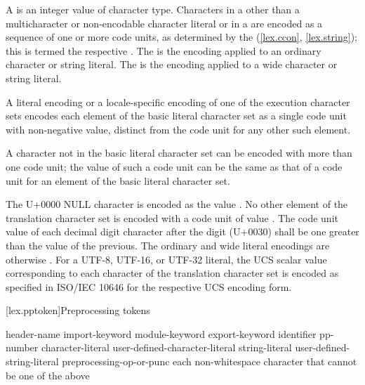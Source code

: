 \pnum
A  is an integer value
of character type.
Characters in a 
other than a multicharacter or non-encodable character literal or
in a  are encoded as
a sequence of one or more code units, as determined
by the  (\ref{lex.ccon}, \ref{lex.string});
this is termed the respective .
The  is
the encoding applied to an ordinary character or string literal.
The  is the encoding applied
to a wide character or string literal.

\pnum
A literal encoding or a locale-specific encoding of one of
the execution character sets
encodes each element of the basic literal character set as
a single code unit with non-negative value,
distinct from the code unit for any other such element.
\begin{note}
A character not in the basic literal character set
can be encoded with more than one code unit;
the value of such a code unit can be the same as
that of a code unit for an element of the basic literal character set.
\end{note}
The U+0000 NULL character is encoded as the value .
No other element of the translation character set
is encoded with a code unit of value .
The code unit value of each decimal digit character after the digit  (U+0030)
shall be one greater than the value of the previous.
The ordinary and wide literal encodings are otherwise
.
For a UTF-8, UTF-16, or UTF-32 literal,
the UCS scalar value
corresponding to each character of the translation character set
is encoded as specified in ISO/IEC 10646 for the respective UCS encoding form.

[lex.pptoken]{Preprocessing tokens}

%
\begin{bnf}
\br
    header-name\br
    import-keyword\br
    module-keyword\br
    export-keyword\br
    identifier\br
    pp-number\br
    character-literal\br
    user-defined-character-literal\br
    string-literal\br
    user-defined-string-literal\br
    preprocessing-op-or-punc\br
    \textnormal{each non-whitespace character that cannot be one of the above}
\end{bnf}

